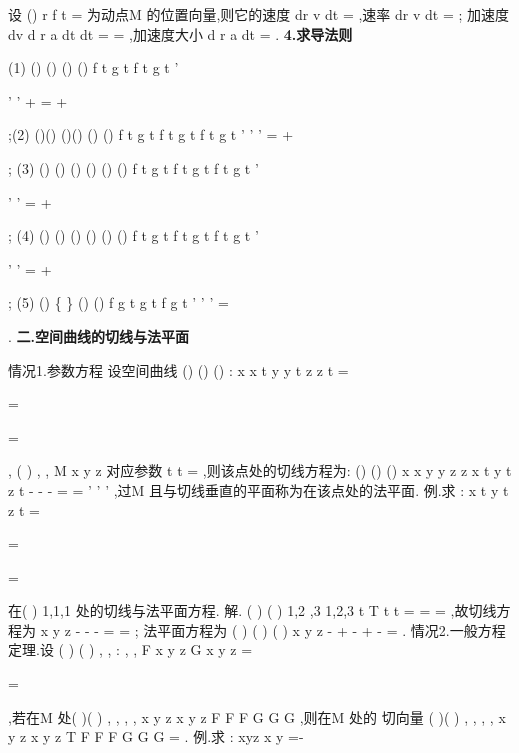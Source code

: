 设
()
r
f t
=
\rho 
\rho 
为动点M 的位置向量,则它的速度
dr
v
dt
=
\rho 
\rho 
,速率
dr
v
dt
=
\rho 
; 
加速度
dv
d r
a
dt
dt
=
=
\rho 
\rho 
\rho 
,加速度大小
d r
a
dt
=
\rho 
. 
{\bfseries \textcolor{lyred}{4.求导法则}}

(1)
()
()
()
()
f t
g t
f
t
g t
\alpha 
\beta 
\alpha 
\beta 
'


'
'
+
=
+


\rho 
\rho 
\rho 
\rho 
;(2)
()()
()()
()
()
f t g t
f
t g t
f t g t
'
'
'
=
+




\rho 
\rho 
\rho 
; 
(3)
()
()
()
()
()
()
f t
g t
f
t
g t
f t
g t
'


'
'
\cdots 
=
\cdots 
+
\cdots 


\rho 
\rho 
\rho 
\rho 
\rho 
\rho 
; 
(4)
()
()
()
()
()
()
f t
g t
f
t
g t
f t
g t
'


'
'
\times 
=
\times 
+
\times 


\rho 
\rho 
\rho 
\rho 
\rho 
\rho 
; 
(5)
()
\{
\}
()
()
f
g t
g t f
g t
'
'
'
=








\rho 
\rho 
. 
\vspace{4pt}
{\bfseries \textcolor{lyred}{二.空间曲线的切线与法平面}}

\textcolor{lyred}{情况1}.\textcolor{lyred}{参数方程} 
设空间曲线
()
()
()
:
x
x t
y
y t
z
z t
=


\Gamma 
=


=

,
(
)
,
,
M x
y z
对应参数
t
t
=
,则该点处的\textcolor{lyred}{切线}方程为: 
()
()
()
x
x
y
y
z
z
x t
y t
z t
-
-
-
=
=
'
'
'
,过M 且与切线垂直的平面称为\Gamma 在该点处的\textcolor{lyred}{法平面}. 
\textcolor{lyred}{例}.求
:
x
t
y
t
z
t
=


\Gamma 
=

=

在(
)
1,1,1 处的切线与法平面方程. 
解.
(
)
(
)
1,2 ,3
1,2,3
t
T
t
t
=
=
=
\rho 
,故切线方程为
x
y
z
-
-
-
=
=
; 
法平面方程为
(
)
(
)
(
)
x
y
z
\cdots 
-
+\cdots 
-
+\cdots 
-
=
. 
\textcolor{lyred}{情况2}.\textcolor{lyred}{一般方程} 
\textcolor{lyred}{定理}.设
(
)
(
)
, ,
:
, ,
F x y z
G x y z
=

\Gamma 
=

,若在M 处(
)(
)
,
,
,
,
x
y
z
x
y
z
F F F
G G G
\times 
\neq 
\rho 
,则\Gamma 在M 处的 
切向量
(
)(
)
,
,
,
,
x
y
z
x
y
z
T
F F F
G G G
=
\times 
\rho 
. 
\textcolor{lyred}{例}.求
:
xyz
x
y
=-

